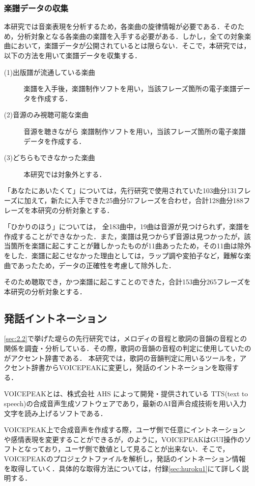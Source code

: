 \subsubsection{楽譜データの収集}
本研究では音楽表現を分析するため，各楽曲の旋律情報が必要である．そのため，分析対象となる各楽曲の楽譜を入手する必要がある．しかし，全ての対象楽曲において，楽譜データが公開されているとは限らない．そこで，本研究では，以下の方法を用いて楽譜データを収集する．
\begin{description}
  \item[(1)出版譜が流通している楽曲] 楽譜を入手後，楽譜制作ソフトを用い，当該フレーズ箇所の電子楽譜データを作成する．
  \item[(2)音源のみ視聴可能な楽曲] 音源を聴きながら 楽譜制作ソフトを用い，当該フレーズ箇所の電子楽譜データを作成する．
  \item[(3)どちらもできなかった楽曲] 本研究では対象外とする．
\end{description}


「あなたにあいたくて」については，先行研究で使用されていた103曲分131フレーズに加えて，新たに入手できた25曲分57フレーズを合わせ，合計128曲分188フレーズを本研究の分析対象とする．

「ひかりのほう」については，
全183曲中，19曲は音源が見つけられず，楽譜を作成することができなかった．また，楽譜は見つからず音源は見つかったが，該当箇所を楽譜に起こすことが難しかったものが11曲あったため，その11曲は除外をした．楽譜に起こせなかった理由としては，ラップ調や変拍子など，難解な楽曲であったため，データの正確性を考慮して除外した．\par
そのため聴取でき，かつ楽譜に起こすことのできた，合計153曲分265フレーズを本研究の分析対象とする．





\subsection{発話イントネーション}\label{sec:3.3}
\ref{sec:2.2}で挙げた堤らの先行研究では，メロディの音程と歌詞の音韻の音程との関係を調査・分析している．その際，歌詞の音韻の音程の判定に使用していたのがアクセント辞書である．
本研究では，歌詞の音韻判定に用いるツールを，アクセント辞書からVOICEPEAK\cite{voicepeak}に変更し，発話のイントネーションを取得する．

VOICEPEAK\cite{voicepeak}とは、株式会社 AHS によって開発・提供されている TTS(text to speech)の合成音声生成ソフトウェアであり，最新のAI音声合成技術を用い入力文字を読み上げるソフトである．\par
VOICEPEAK上で合成音声を作成する際，ユーザ側で任意にイントネーションや感情表現を変更することができるが，のように，VOICEPEAKはGUI操作のソフトとなっており，ユーザ側で数値として見ることが出来ない．そこで，VOICEPEAKのプロジェクトファイルを解析し，発話のイントネーション情報を取得していく．具体的な取得方法については，付録\ref{sec:huroku1}にて詳しく説明する．


